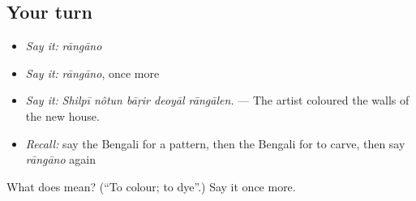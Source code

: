 \subsection*{Your turn}
\begin{itemize}
\raggedright
  \item \emph{Say it:} \emph{rāngāno}
  \item \emph{Say it:} \emph{rāngāno}, once more
  \item \emph{Say it:} \emph{Shilpī nôtun bāṛir deoyāl rāngālen.} — The artist coloured the walls of the new house.
  \item \emph{Recall:} say the Bengali for a pattern, then the Bengali for to carve, then say \emph{rāngāno} again
\end{itemize}

\begin{tcolorbox}[breakable,colback=teal!4,colframe=teal!35!black,title={Before you move on}]
What does  mean? (\textquotedblleft{}To colour; to dye\textquotedblright{}.) Say it once more.
\end{tcolorbox}
